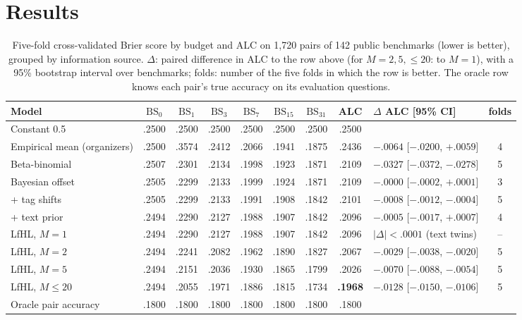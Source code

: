 \documentclass{article}
\newcommand{\lfhl}{LfHL}
\begin{document}
\section{Results}
\label{sec:results}

\begin{table}[t]
  \caption{Five-fold cross-validated Brier score by budget and ALC on 1{,}720 pairs of 142 public benchmarks (lower is better), grouped by information source. $\Delta$: paired difference in ALC to the row above (for $M = 2, 5, \le 20$: to $M = 1$), with a 95\% bootstrap interval over benchmarks; folds: number of the five folds in which the row is better. The oracle row knows each pair's true accuracy on its evaluation questions.}
  \label{tab:main}
  \centering
  \footnotesize
  \setlength{\tabcolsep}{3pt}
  \begin{tabular}{@{}lccccccc@{\hspace{5pt}}l@{\hspace{4pt}}c@{}}
    \toprule
    Model & $\mathrm{BS}_0$ & $\mathrm{BS}_1$ & $\mathrm{BS}_3$ & $\mathrm{BS}_7$ & $\mathrm{BS}_{15}$ & $\mathrm{BS}_{31}$ & ALC & $\Delta$ ALC [95\% CI] & folds \\
    \midrule
    Constant 0.5 & .2500 & .2500 & .2500 & .2500 & .2500 & .2500 & .2500 & & \\
    \midrule
    Empirical mean (organizers) & .2500 & .3574 & .2412 & .2066 & .1941 & .1875 & .2436 & $-.0064$ [$-.0200$, $+.0059$] & 4 \\
    Beta-binomial & .2507 & .2301 & .2134 & .1998 & .1923 & .1871 & .2109 & $-.0327$ [$-.0372$, $-.0278$] & 5 \\
    Bayesian offset & .2505 & .2299 & .2133 & .1999 & .1924 & .1871 & .2109 & $-.0000$ [$-.0002$, $+.0001$] & 3 \\
    \quad + tag shifts & .2505 & .2299 & .2133 & .1991 & .1908 & .1842 & .2101 & $-.0008$ [$-.0012$, $-.0004$] & 5 \\
    \quad + text prior & .2494 & .2290 & .2127 & .1988 & .1907 & .1842 & .2096 & $-.0005$ [$-.0017$, $+.0007$] & 4 \\
    \midrule
    \lfhl, $M=1$ & .2494 & .2290 & .2127 & .1988 & .1907 & .1842 & .2096 & $|\Delta| < .0001$ (text twins) & -- \\
    \lfhl, $M=2$ & .2494 & .2241 & .2082 & .1962 & .1890 & .1827 & .2067 & $-.0029$ [$-.0038$, $-.0020$] & 5 \\
    \lfhl, $M=5$ & .2494 & .2151 & .2036 & .1930 & .1865 & .1799 & .2026 & $-.0070$ [$-.0088$, $-.0054$] & 5 \\
    \lfhl, $M\le 20$ & .2494 & .2055 & .1971 & .1886 & .1815 & .1734 & \textbf{.1968} & $-.0128$ [$-.0150$, $-.0106$] & 5 \\
    \midrule
    Oracle pair accuracy & .1800 & .1800 & .1800 & .1800 & .1800 & .1800 & .1800 & & \\
    \bottomrule
  \end{tabular}
\end{table}
\end{document}
